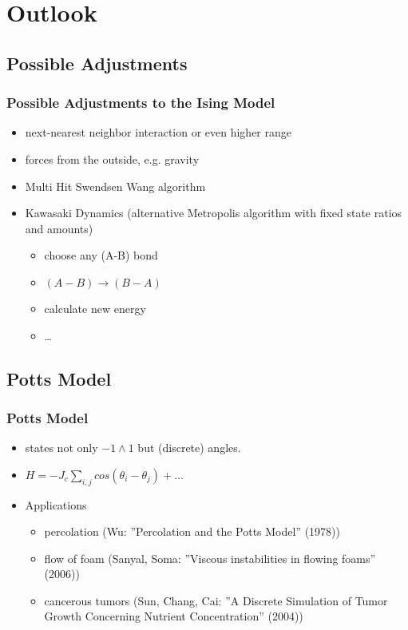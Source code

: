 \documentclass{beamer}
\begin{document}

\section{Outlook}\subsection{Possible Adjustments}
\begin{frame}
\frametitle{Possible Adjustments to the Ising Model}
\begin{itemize}
\item next-nearest neighbor interaction or even higher range
\item forces from the outside, e.g. gravity
\item Multi Hit Swendsen Wang algorithm
\item Kawasaki Dynamics (alternative Metropolis algorithm with fixed state ratios and amounts)\begin{itemize}
\item choose any (A-B) bond
\item $(A-B) \rightarrow (B-A)$
\item calculate new energy
\item \ldots
\end{itemize}
\end{itemize}
\end{frame}
\subsection{Potts Model}
\begin{frame}
\frametitle{Potts Model}
\begin{itemize}
\item states not only $-1 \land 1$ but (discrete) angles.
\item $H = -J_c \sum_{i,j}cos\left(\theta_i -\theta_j\right) +  \ldots$
\item Applications
\begin{itemize}
\item
percolation (Wu: ''Percolation and the Potts Model'' (1978))
\item 
flow of foam (Sanyal, Soma: ''Viscous instabilities in flowing foams'' (2006))
\item 
cancerous tumors (Sun, Chang, Cai: ''A Discrete Simulation of Tumor Growth Concerning Nutrient Concentration'' (2004))
\end{itemize}
\end{itemize}
\end{frame}
\end{document}
